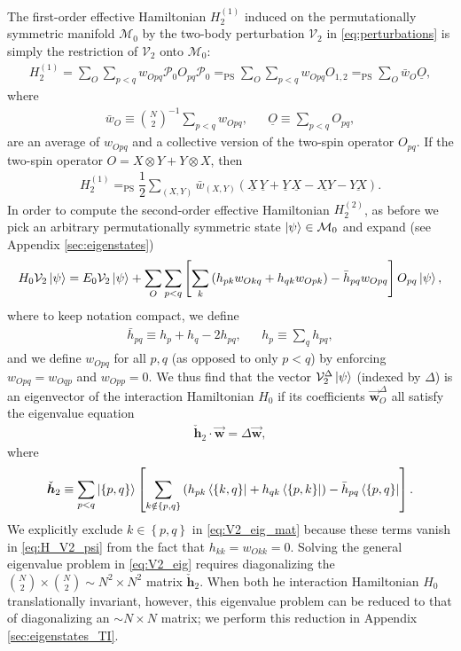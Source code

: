 \documentclass[nofootinbib,notitlepage,11pt]{revtex4-2}
\newcommand{\f}[2]{\dfrac{#1}{#2}} %
\newcommand{\p}[1]{\left(#1\right)} %
\renewcommand{\sp}[1]{\left[#1\right]} %
\renewcommand{\set}[1]{\left\{#1\right\}} %
\renewcommand{\c}{\cdot} %
\newcommand{\m}{\bm} %
\renewcommand{\v}{\vec} %
\newcommand{\1}{\mathds{1}}
\newcommand{\M}{\mathcal{M}}
\renewcommand{\P}{\mathcal{P}}
\newcommand{\V}{\mathcal{V}}
\newcommand{\EQPS}{=_{\text{PS}}}
\newcommand{\col}{\underline}
\begin{document}
The first-order effective Hamiltonian $H_2^{(1)}$ induced on the
permutationally symmetric manifold $\M_0$ by the two-body perturbation
$\V_2$ in \eqref{eq:perturbations} is simply the restriction of $\V_2$
onto $\M_0$:
\begin{align}
  H_2^{(1)} = \sum_O \sum_{p<q} w_{Opq} \P_0 O_{pq} \P_0
  \EQPS \sum_O \sum_{p<q} w_{Opq} O_{1,2}
  \EQPS \sum_O \bar w_O \col{O},
\end{align}
where
\begin{align}
  \bar w_O \equiv {N \choose 2}^{-1} \sum_{p<q} w_{Opq},
  &&
  \col{O} \equiv \sum_{p<q} O_{pq},
\end{align}
are an average of $w_{Opq}$ and a collective version of the two-spin
operator $O_{pq}$.  If the two-spin operator
$O=X\otimes Y+Y\otimes X$, then
\begin{align}
  H_2^{(1)} \EQPS \f12 \sum_{\p{X,Y}} \bar w_{\p{X,Y}}
  \p{\col{X}\,\col{Y} + \col{Y}\,\col{X} - \col{XY} - \col{YX}}.
\end{align}
In order to compute the second-order effective Hamiltonian
$H_2^{(2)}$, as before we pick an arbitrary permutationally symmetric
state $\ket\psi\in\M_0$ and expand (see Appendix
\ref{sec:eigenstates})
\begin{align}
  H_0 \V_2 \ket\psi
  = E_0 \V_2 \ket\psi
  + \sum_O \sum_{p<q}
  \sp{\sum_k \p{h_{pk} w_{Okq} + h_{qk} w_{Opk}}
  - \bar h_{pq} w_{Opq}}
  O_{pq} \ket\psi,
  \label{eq:H_V2_psi}
\end{align}
where to keep notation compact, we define
\begin{align}
  \bar h_{pq} \equiv h_p + h_q - 2 h_{pq},
  &&
  h_p \equiv \sum_q h_{pq},
\end{align}
and we define $w_{Opq}$ for all $p,q$ (as opposed to only $p<q$) by
enforcing $w_{Opq}=w_{Oqp}$ and $w_{Opp}=0$.  We thus find that the
vector $\V_2^\Delta\ket\psi$ (indexed by $\Delta$) is an eigenvector
of the interaction Hamiltonian $H_0$ if its coefficients
$\v{\m w}_O^\Delta$ all satisfy the eigenvalue equation
\begin{align}
  \check{\m h}_2 \c \v{\m w} = \Delta \v{\m w},
  \label{eq:V2_eig}
\end{align}
where
\begin{align}
  \check{\m h}_2
  \equiv \sum_{p<q} \ket{\set{p,q}} \sp{\sum_{k\notin\set{p,q}}
    \p{h_{pk} \bra{\set{k,q}} + h_{qk} \bra{\set{p,k}}}
    - \bar h_{pq} \bra{\set{p,q}}}.
  \label{eq:V2_eig_mat}
\end{align}
We explicitly exclude $k\in\set{p,q}$ in \eqref{eq:V2_eig_mat} because
these terms vanish in \eqref{eq:H_V2_psi} from the fact that
$h_{kk}=w_{Okk}=0$.  Solving the general eigenvalue problem in
\eqref{eq:V2_eig} requires diagonalizing the
${N \choose 2}\times{N \choose 2}\sim N^2\times N^2$ matrix
$\check{\m h}_2$.  When both he interaction Hamiltonian $H_0$
translationally invariant, however, this eigenvalue problem can be
reduced to that of diagonalizing an $\sim N\times N$ matrix; we
perform this reduction in Appendix \ref{sec:eigenstates_TI}.
\end{document}
